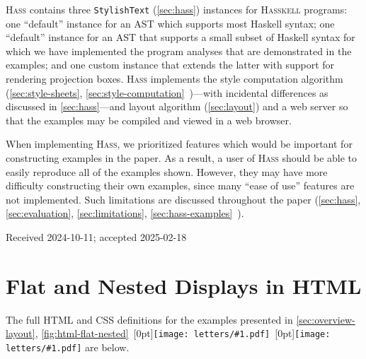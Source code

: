 \documentclass[acmsmall, screen]{acmart}
\newcommand{\refAppendixStyleComputation}
  {\autoref{sec:style-computation}~\cite{Hass}}
\newcommand{\refAppendixHassExamples}
  {\autoref{sec:hass-examples}~\cite{Hass}}
\newcommand{\hass}
{\textsc{Hass}}
\newcommand{\hasskell}
{\textsc{Hasskell}}
\newcommand{\figBubble}[1]{\raisebox{-0.03in}[0pt]{\texttt{[image: letters/\#1.pdf]}}}
\newcommand{\refBubble}[1]
  {~\figBubble{#1}}
\begin{document}
\hass{} contains three \texttt{StylishText} (\autoref{sec:hass}) instances for \hasskell{} programs:
one ``default'' instance for an AST which supports most Haskell syntax;
one ``default'' instance for an AST that supports a small subset of Haskell syntax for which we have implemented the program analyses that are demonstrated in the examples; and
one custom instance that extends the latter with support for rendering projection boxes.
\hass{} implements the style computation algorithm (\autoref{sec:style-sheets}, \refAppendixStyleComputation{})---with incidental differences as discussed in \autoref{sec:hass}---and layout algorithm (\autoref{sec:layout}) and a web server so that the examples may be compiled and viewed in a web browser.

When implementing \hass{}, we prioritized features which would be important for constructing examples in the paper.
As a result, a user of \hass{} should be able to easily reproduce all of the examples shown.
However, they may have more difficulty constructing their own examples, since many ``ease of use'' features are not implemented.
Such limitations are discussed throughout the paper (\autoref{sec:hass}, \autoref{sec:evaluation}, \autoref{sec:limitations}, \refAppendixHassExamples{}).
 



\vspace{0.09in}
\noindent
{\small Received 2024-10-11; accepted 2025-02-18}

\clearpage

\appendix

\renewcommand{\leftmark}{}
\renewcommand{\rightmark}{}
\pagestyle{headings}

\section{Flat and Nested Displays in HTML}
\label{sec:html-flat-nested}

The full HTML and CSS definitions for the examples presented in \autoref{sec:overview-layout}, \autoref{fig:html-flat-nested}\refBubble{a}\refBubble{b} are below.

\bigskip
\end{document}
